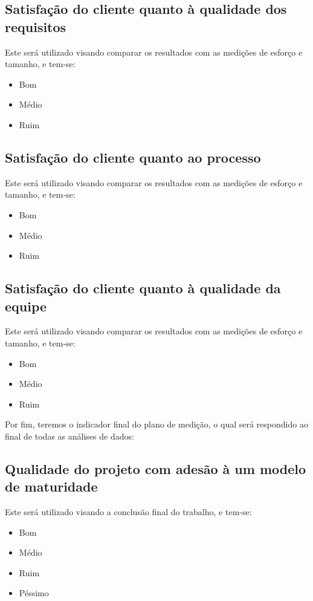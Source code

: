 \subsection{Satisfação do cliente quanto à qualidade dos requisitos}
	Este será utilizado visando comparar os resultados com as medições de esforço e tamanho, e tem-se:
	\begin{itemize}
		\item Bom
		\item Médio
		\item Ruim
	\end{itemize}
\subsection{Satisfação do cliente quanto ao processo}
	Este será utilizado visando comparar os resultados com as medições de esforço e tamanho, e tem-se:
	\begin{itemize}
		\item Bom
		\item Médio
		\item Ruim
	\end{itemize}
\subsection{Satisfação do cliente quanto à qualidade da equipe}
	Este será utilizado visando comparar os resultados com as medições de esforço e tamanho, e tem-se:
	\begin{itemize}
		\item Bom
		\item Médio
		\item Ruim
	\end{itemize}

Por fim, teremos o indicador final do plano de medição, o qual será respondido ao final de todas as análises de dados:

\subsection{Qualidade do projeto com adesão à um modelo de maturidade}
	Este será utilizado visando a conclusão final do trabalho, e tem-se:
	\begin{itemize}
		\item Bom
		\item Médio
		\item Ruim
		\item Péssimo
	\end{itemize}